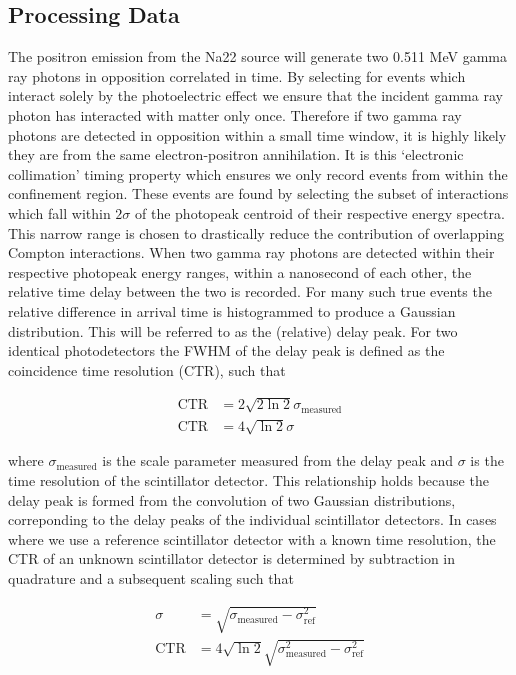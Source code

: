 \subsection{Processing Data}
The positron emission from the Na22 source will generate two 0.511 MeV gamma ray photons in opposition correlated in time. By selecting for events which interact solely by the photoelectric effect we ensure that the incident gamma ray photon has interacted with matter only once. Therefore if two gamma ray photons are detected in opposition within a small time window, it is highly likely they are from the same electron-positron annihilation. It is this `electronic collimation' timing property which ensures we only record events from within the confinement region. These events are found by selecting the subset of interactions which fall within $2\sigma$ of the photopeak centroid of their respective energy spectra. This narrow range is chosen to drastically reduce the contribution of overlapping Compton interactions. When two gamma ray photons are detected within their respective photopeak energy ranges, within a nanosecond of each other, the relative time delay between the two is recorded. For many such true events the relative difference in  arrival time is histogrammed to produce a Gaussian distribution. This will be referred to as the (relative) delay peak. For two identical photodetectors the FWHM of the delay peak is defined as the coincidence time resolution (CTR), such that

\begin{align}
\text{CTR} &= 2\sqrt{2\ln{2}}\sigma_\text{measured}\\
\text{CTR} &= 4\sqrt{\ln{2}}\sigma
\label{eqn:ctrtoscale}
\end{align}

where $\sigma_\textrm{measured}$ is the scale parameter measured from the delay peak and $\sigma$ is the time resolution of the scintillator detector. This relationship holds because the delay peak is formed from the convolution of two Gaussian distributions, correponding to the delay peaks of the individual scintillator detectors. In cases where we use a reference scintillator detector with a known time resolution, the CTR of an unknown scintillator detector is determined by subtraction in quadrature and a subsequent scaling such that

\begin{align}
\sigma &= \sqrt{\sigma_\textrm{measured} - \sigma_\textrm{ref}^2}\\
\text{CTR} &= 4\sqrt{\ln{2}}\sqrt{\sigma_\textrm{measured}^2-\sigma_\textrm{ref}^2}
\end{align}


